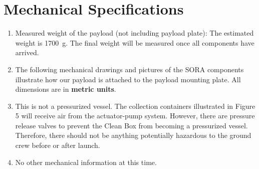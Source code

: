 \newpage
\section{Mechanical Specifications}
\label{sec:Mechanical}

\hspace*{0.5cm}
\begin{minipage}{\linewidth-0.5cm}
  \begin{enumerate}[label=\Alph*.]
    
  \item Measured weight of the payload (not including payload plate): \newline
        The estimated weight is \SI{1700}{\gram}. The final weight will be measured once all components have arrived.
    
  \item The following mechanical drawings and pictures of the SORA components illustrate how our payload is attached to the payload mounting plate. All dimensions are in \textbf{metric units}.
    
  \item This is not a pressurized vessel. The collection containers illustrated in Figure 5 will receive air from the actuator-pump system. However, there are pressure release valves to prevent the Clean Box from becoming a pressurized vessel. Therefore, there should not be anything potentially hazardous to the ground crew before or after launch.

  \item No other mechanical information at this time.

  \end{enumerate}
\end{minipage}


